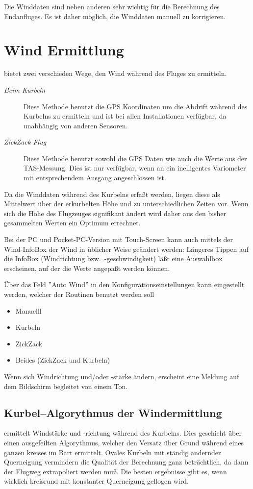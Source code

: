 Die Winddaten sind neben anderen sehr wichtig für die Berechnung des Endanfluges.
Es ist daher möglich, die Winddaten manuell zu korrigieren.

\section{Wind Ermittlung}\label{sec:wind-estimation}
\xc bietet zwei verschieden Wege, den Wind während des Fluges zu ermitteln.
\begin{description}
\item[\textit{Beim Kurbeln}]  Diese Methode benutzt die  GPS Koordinaten um die Abdrift während
des Kurbelns zu ermitteln und ist bei allen \xc Installationen verfügbar, da unabhängig von anderen Sensoren.
\item[\textit{ZickZack Flug}] Diese Methode benutzt sowohl die GPS Daten wie auch die Werte aus der TAS-Messung.
Dies ist nur verfügbar, wenn \xc an ein inelligentes Variometer mit entsprechendem Ausgang angeschlossen ist.
\end{description}

Da die Winddaten während des Kurbelns erfaßt werden, liegen diese als Mittelwert über der erkurbelten Höhe und
zu unterschiedlichen Zeiten vor. Wenn sich die Höhe des Flugzeuges signifikant ändert wird daher aus den
bisher gesammelten Werten ein Optimum errechnet.

Bei der PC und Pocket-PC-Version mit Touch-Screen kann auch mittels der Wind-InfoBox der Wind in
üblicher Weise geändert werden:
Längeres Tippen auf die InfoBox (Windrichtung bzw.\ -geschwindigkeit) läßt eine Auswahlbox
erscheinen, auf der die Werte angepaßt  werden können.

Über das Feld ''Auto Wind'' in den Konfigurationseinstellungen  kann
eingestellt werden, welcher der Routinen benutzt werden soll

\begin{itemize}
\item Manuelll
\item Kurbeln
\item ZickZack
\item Beides (ZickZack und Kurbeln)
\end{itemize}

Wenn sich Windrichtung und/oder -stärke ändern, erscheint eine Meldung  auf dem Bildschirm begleitet von einem Ton.
\subsection*{Kurbel--Algorythmus der Windermittlung}
\xc ermittelt Windstärke und -richtung während des Kurbelns. Dies geschieht über einen ausgefeilten Algorythmus, welcher den Versatz über Grund während eines ganzen kreises im Bart ermittelt. Ovales Kurbeln mit ständig ändernder Querneigung vermindern die Qualität der Berechnung ganz beträchtlich, da dann der Flugweg extrapoliert werden muß. Die besten ergebnisse gibt es, wenn wirklich kreisrund mit konstanter Querneigung geflogen wird.

